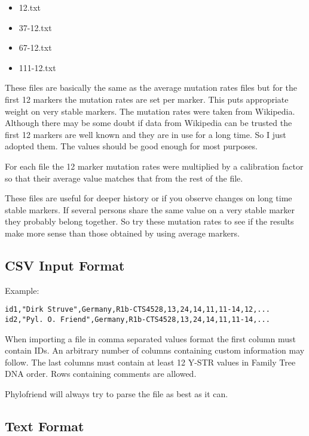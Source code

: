 \begin{itemize}
\item 12.txt
\item 37-12.txt
\item 67-12.txt
\item 111-12.txt
\end{itemize}

These files are basically the same as the average mutation
rates files but for the first 12 markers the mutation rates
are set per marker. This puts appropriate weight on
very stable markers. The mutation rates were taken from
Wikipedia\cite{Wiki-List_of_DYS_markers}. Although there
may be some doubt if data from Wikipedia can be trusted 
the first 12 markers are well known and they are in use
for a long time. So I just adopted them. The values should be
good enough for most purposes.

For each file the 12 marker mutation rates were multiplied
by a calibration factor so that their average value matches
that from the rest of the file.

These files are useful for deeper history or if you
observe changes on long time stable markers. If several
persons share the same value on a very stable marker they
probably belong together. So try these mutation rates to
see if the results make more sense than those obtained by
using average markers.


\subsection{CSV Input Format}

Example:

\begin{verbatim}
id1,"Dirk Struve",Germany,R1b-CTS4528,13,24,14,11,11-14,12,...
id2,"Pyl. O. Friend",Germany,R1b-CTS4528,13,24,14,11,11-14,...
\end{verbatim}

When importing a file in comma separated values format the
first column must contain IDs. An arbitrary number of columns
containing custom information may follow. The last columns
must contain at least 12 Y-STR values in Family Tree DNA order.
Rows containing comments are allowed.

Phylofriend will always try to parse the file as best as
it can.


\subsection{Text Format}

